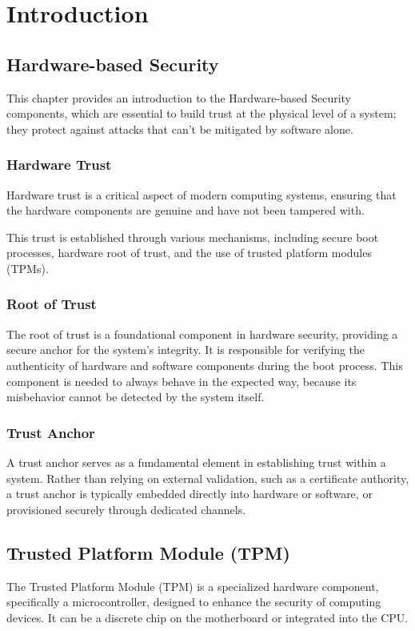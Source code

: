 \chapter{Introduction}
\label{chap1}


\section{Hardware-based Security}
This chapter provides an introduction to the Hardware-based
Security components, which are essential to build trust 
at the physical level of a system; they protect against
attacks that can't be mitigated by software alone.

\subsection{Hardware Trust}
Hardware trust is a critical aspect of modern computing systems,
ensuring that the hardware components are genuine and have not been
tampered with. 

This trust is established through various mechanisms, including
secure boot processes, hardware root of trust, and the use of
trusted platform modules (TPMs).

\subsection{Root of Trust}
The root of trust is a foundational component in hardware security,
providing a secure anchor for the system's integrity.
It is responsible for verifying the authenticity of hardware and
software components during the boot process.
This component is needed to always behave in the expected way,
because its misbehavior cannot be detected by the system itself.

\subsection{Trust Anchor}
A trust anchor serves as a fundamental element in establishing 
trust within a system. Rather than relying on external validation, 
such as a certificate authority, a trust anchor is typically embedded 
directly into hardware or software, or provisioned securely through 
dedicated channels.

\section{Trusted Platform Module (TPM)}
The Trusted Platform Module (TPM) is a specialized hardware component,
specifically a microcontroller, designed to enhance the security of 
computing devices. 
It can be a discrete chip on the motherboard or integrated into the CPU.


